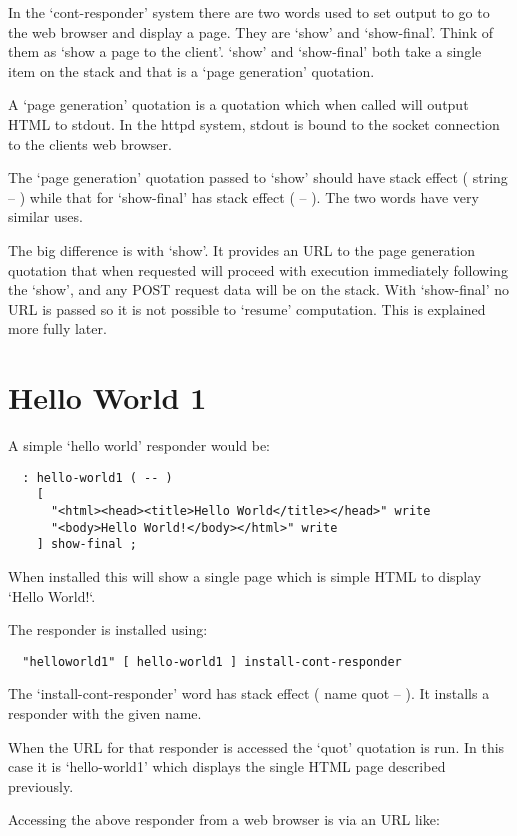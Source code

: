 In the `cont-responder' system there are two words used to set output
to go to the web browser and display a page. They are `show' and
`show-final'. Think of them as `show a page to the client'. `show' and
`show-final' both take a single item on the stack and that is a `page
generation' quotation.

A `page generation' quotation is a quotation which when called will
output HTML to stdout. In the httpd system, stdout is bound to the
socket connection to the clients web browser. 

The `page generation' quotation passed to `show' should have stack
effect ( string -- ) while that for `show-final' has stack effect 
( -- ). The two words have very similar uses. 

The big difference is with `show'. It provides an URL to the page
generation quotation that when requested will proceed with execution
immediately following the `show', and any POST request data will be on
the stack. With `show-final' no URL is passed so it is not possible to
`resume' computation. This is explained more fully later.

\section{Hello World 1}
A simple `hello world' responder would be:

\begin{verbatim}
  : hello-world1 ( -- )
    [
      "<html><head><title>Hello World</title></head>" write
      "<body>Hello World!</body></html>" write
    ] show-final ;
\end{verbatim}

When installed this will show a single page which is simple HTML to
display `Hello World!`. 

The responder is installed using:

\begin{verbatim}
  "helloworld1" [ hello-world1 ] install-cont-responder
\end{verbatim}

The `install-cont-responder' word has stack effect 
( name quot -- ). It installs a responder with the given name. 

When the URL for that responder is accessed the `quot' quotation is
run. In this case it is `hello-world1' which displays the single HTML
page described previously.

Accessing the above responder from a web browser is via an URL like:


